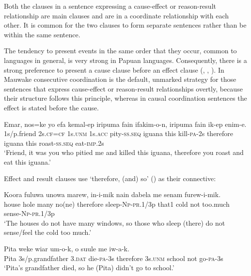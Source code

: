 Both the clauses in a sentence expressing a cause-effect or reason-result relationship are main clauses and are in a coordinate relationship with each other. It is common for the two clauses to form separate sentences rather than be within the same sentence. 

The tendency to present events in the same order that they occur, common to languages in general, is very strong in Papuan languages. Consequently, there is a strong preference to present a cause clause before an effect clause (\citealt[409]{Haiman1980}, \citealt[59]{Roberts1987}, \citealt{Reesink1987}). In Mauwake consecutive coordination is the default, unmarked strategy for those sentences that express cause-effect or reason-result relationships overtly, because their structure follows this principle, whereas in causal coordination sentences the effect is stated before the cause. 

\ea%
\label{ex:x1400}
\gll Emar,  nos=ke  yo  efa  kemal-ep  iripuma  fain ifakim-o-n,    iripuma  fain  ik-ep  enim-e.\\
1s/p.friend  2s.\textsc{cf}=\textsc{cf}  1s.\textsc{unm}  1s.\textsc{acc}  pity-\textsc{ss}.\textsc{seq}  iguana  this kill-\textsc{pa}-2s  therefore  iguana  this  roast-\textsc{ss}.\textsc{seq}  eat-\textsc{imp}.2s\\
\glt`Friend, it was you who pitied me and killed this iguana, therefore you roast and eat this iguana.'
\z


Effect and result clauses use  `therefore, (and) so' () as their connective:

\ea%
\label{ex:x1401}
\gll Koora  fuluwa  unowa  marew,    in-i-mik  nain dabela  me  senam  furew-i-mik.\\
house  hole  many  no(ne)  therefore  sleep-\textsc{Np}-\textsc{pr}.1/3p  that1 cold  not  too.much  sense-\textsc{Np}-\textsc{pr}.1/3p\\
\glt `The houses do not have many windows, so those who sleep (there) do not sense/feel the cold too much.'
\z


\ea%
\label{ex:x1402}
\gll Pita  weke  wiar  um-o-k,    o  suule me  iw-a-k. \\
Pita  3s/p.grandfather  3.\textsc{dat}  die-\textsc{pa}-3s  therefore  3s.\textsc{unm} school not  go-\textsc{pa}-3s\\
\glt`Pita's grandfather died, so he (Pita) didn't go to school.'
\z


